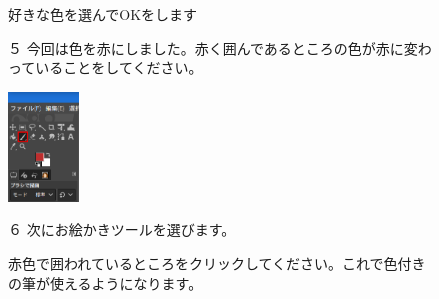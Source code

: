 \documentclass[a4paper,12pt]{jarticle}
\begin{document}
\begin{figure}[ht]
\begin{minipage}{\textwidth}
\begin{minipage}{8.984cm}
      好きな色を選んでOKをします


      \bigskip
      \begin{minipage}{5.984cm}
        ５
        今回は色を赤にしました。赤く囲んであるところの色が赤に変わっていることをしてください。


      \end{minipage}
    \end{minipage}
  \end{minipage}

  \includegraphics[width=1.866cm]{textbook-img127.png}
  \begin{minipage}[b]{6.663cm}
    ６ 次にお絵かきツールを選びます。

    赤色で囲われているところをクリックしてください。これで色付きの筆が使えるようになります。


    \bigskip

  \end{minipage}
\end{figure}
\clearpage
\end{document}
